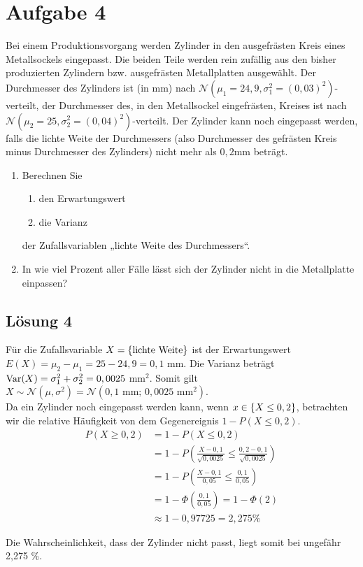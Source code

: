\documentclass[main.tex]{subfiles}
\begin{document}
\section{Aufgabe 4}
Bei einem Produktionsvorgang werden Zylinder in den ausgefrästen Kreis eines Metallsockels eingepasst. Die beiden Teile werden rein zufällig aus den bisher produzierten Zylindern bzw. ausgefrästen Metallplatten ausgewählt. Der Durchmesser des Zylinders ist (in mm) nach $\mathcal{N}(\mu_1{=}24,9, \sigma_1^2{=}(0,03)^2)$-verteilt, der Durchmesser des, in den Metallsockel eingefrästen, Kreises ist nach $\mathcal{N}(\mu_2{=}25, \sigma_2^2 {=} (0,04)^2)$-verteilt. Der Zylinder kann noch eingepasst werden, falls die lichte Weite der Durchmessers (also Durchmesser des gefrästen Kreis minus Durchmesser des Zylinders) nicht mehr als $0,2$mm beträgt.
\begin{enumerate}
\item Berechnen Sie
\begin{enumerate}
\item den Erwartungswert
\item die Varianz
\end{enumerate}
der Zufallsvariablen „lichte Weite des Durchmessers“.
\item In wie viel Prozent aller Fälle lässt sich der Zylinder nicht in die Metallplatte einpassen?
\end{enumerate}

\subsection{Lösung 4}
Für die Zufallsvariable $X=\{\text{lichte Weite}\}$ ist der Erwartungswert $E(X) = \mu_2 - \mu_1 = 25 - 24,9 = 0,1$ mm.
Die Varianz beträgt $\operatorname{Var}(X) = \sigma_1^2 + \sigma_2^2 = 0,0025$ mm$^2$.
Somit gilt $X\sim\mathcal{N}(\mu, \sigma^2) = \mathcal{N}(0,1\mbox{ mm};\, 0,0025\mbox{ mm}^2)$.\\

Da ein Zylinder noch eingepasst werden kann, wenn $x\in\{X\leq 0,2\}$, betrachten wir die relative Häufigkeit von dem Gegenereignis $1 - P(X\leq 0,2)$.
$$\begin{aligned}
    P(X\geq 0,2) &= 1 - P(X\leq 0,2) \\[2mm]
    &= 1 - P\left( \frac{X - 0,1}{\sqrt{0,0025}} \leq \frac{0,2 - 0,1}{\sqrt{0,0025}}\right) \\[2mm]
    &= 1 - P\left( \frac{X - 0,1}{0,05} \leq \frac{0,1}{0,05}\right) \\[2mm]
    &= 1 - \Phi\left(\frac{0,1}{0,05}\right) = 1 - \Phi(2) \\[2mm]
    &\approx 1 - 0,97725 = 2,275 \%
\end{aligned}$$

Die Wahrscheinlichkeit, dass der Zylinder nicht passt, liegt somit bei ungefähr 2,275 \%.
\end{document}
